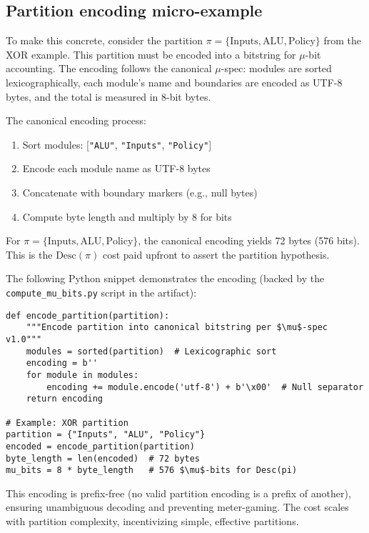 \documentclass[11pt]{article}
\begin{document}
\subsection{Partition encoding micro-example}
To make this concrete, consider the partition $\pi = \{\text{Inputs}, \text{ALU}, \text{Policy}\}$ from the XOR example. This partition must be encoded into a bitstring for $\mu$-bit accounting. The encoding follows the canonical $\mu$-spec: modules are sorted lexicographically, each module's name and boundaries are encoded as UTF-8 bytes, and the total is measured in 8-bit bytes.

The canonical encoding process:
\begin{enumerate}
  \item Sort modules: [\texttt{"ALU"}, \texttt{"Inputs"}, \texttt{"Policy"}]
  \item Encode each module name as UTF-8 bytes
  \item Concatenate with boundary markers (e.g., null bytes)
  \item Compute byte length and multiply by 8 for bits
\end{enumerate}

For $\pi = \{\text{Inputs}, \text{ALU}, \text{Policy}\}$, the canonical encoding yields 72 bytes (576 bits). This is the $\mathrm{Desc}(\pi)$ cost paid upfront to assert the partition hypothesis.

The following Python snippet demonstrates the encoding (backed by the \texttt{compute\_mu\_bits.py} script in the artifact):
\begin{verbatim}
def encode_partition(partition):
    """Encode partition into canonical bitstring per $\mu$-spec v1.0"""
    modules = sorted(partition)  # Lexicographic sort
    encoding = b''
    for module in modules:
        encoding += module.encode('utf-8') + b'\x00'  # Null separator
    return encoding

# Example: XOR partition
partition = {"Inputs", "ALU", "Policy"}
encoded = encode_partition(partition)
byte_length = len(encoded)  # 72 bytes
mu_bits = 8 * byte_length   # 576 $\mu$-bits for Desc(pi)
\end{verbatim}

This encoding is prefix-free (no valid partition encoding is a prefix of another), ensuring unambiguous decoding and preventing meter-gaming. The cost scales with partition complexity, incentivizing simple, effective partitions.
\end{document}
